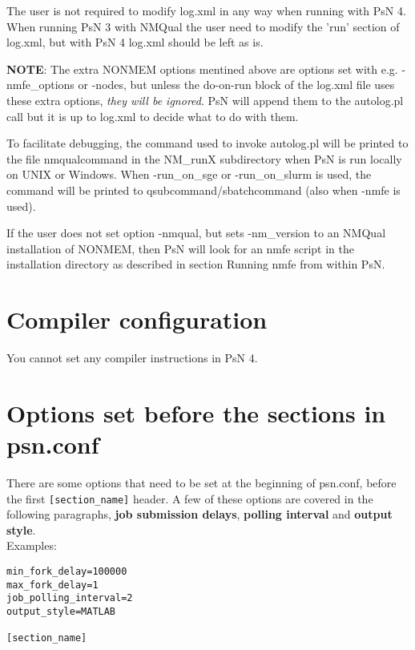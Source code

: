 The user is not required to modify log.xml in any way when running with PsN 4. When running PsN 3 with NMQual the user need to modify the 'run' section of log.xml, but with PsN 4 log.xml should be left as is.

\textbf{NOTE}: The extra NONMEM options mentined above are options set with e.g. -nmfe\_options or -nodes, but unless the do-on-run block of the log.xml file uses these extra options, \emph{they will be ignored}. 
PsN will append them to the autolog.pl call but it is up to log.xml to decide what to do with them.

To facilitate debugging, the command used to invoke autolog.pl will be printed to the file nmqualcommand in the NM\_runX subdirectory when PsN is run locally on UNIX or Windows. When -run\_on\_sge or -run\_on\_slurm is used, the command
will be printed to qsubcommand/sbatchcommand (also when -nmfe is used). 

If the user does not set option -nmqual, but sets -nm\_version to an NMQual installation of NONMEM, then PsN will look for an nmfe script in the installation directory as described in section Running nmfe from within PsN.

\section{Compiler configuration}

You cannot set any compiler instructions in PsN 4.
\section{Options set before the sections in psn.conf}
There are some options that need to be set at the beginning of psn.conf, before the first \verb|[section_name]| header. A few of these options are covered in the following paragraphs, \textbf{job submission delays}, \textbf{polling interval} and \textbf{output style}.\\
Examples:
\begin{verbatim}
min_fork_delay=100000
max_fork_delay=1
job_polling_interval=2
output_style=MATLAB

[section_name]
\end{verbatim}


